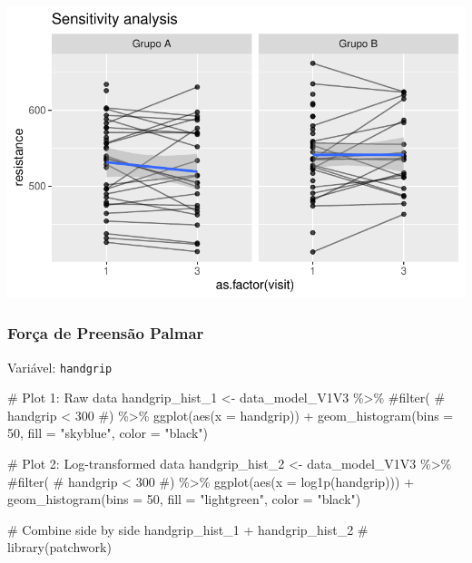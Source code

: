 \documentclass[
  letterpaper,
  DIV=11,
  numbers=noendperiod]{scrartcl}
\newenvironment{Shaded}{\begin{snugshade}}{\end{snugshade}}
\newcommand{\AttributeTok}[1]{\textcolor[rgb]{0.40,0.45,0.13}{#1}}
\newcommand{\CommentTok}[1]{\textcolor[rgb]{0.37,0.37,0.37}{#1}}
\newcommand{\DecValTok}[1]{\textcolor[rgb]{0.68,0.00,0.00}{#1}}
\newcommand{\FunctionTok}[1]{\textcolor[rgb]{0.28,0.35,0.67}{#1}}
\newcommand{\NormalTok}[1]{\textcolor[rgb]{0.00,0.23,0.31}{#1}}
\newcommand{\OtherTok}[1]{\textcolor[rgb]{0.00,0.23,0.31}{#1}}
\newcommand{\SpecialCharTok}[1]{\textcolor[rgb]{0.37,0.37,0.37}{#1}}
\newcommand{\StringTok}[1]{\textcolor[rgb]{0.13,0.47,0.30}{#1}}
\begin{document}
\includegraphics{Outcomes_V1V2V3_files/figure-pdf/resistance_6-2.pdf}

\subsubsection{Força de Preensão
Palmar}\label{foruxe7a-de-preensuxe3o-palmar}

Variável: \texttt{handgrip}

\begin{Shaded}
\begin{Highlighting}[]
\CommentTok{\# Plot 1: Raw data}
\NormalTok{handgrip\_hist\_1 }\OtherTok{\textless{}{-}}\NormalTok{ data\_model\_V1V3 }\SpecialCharTok{\%\textgreater{}\%} 
    \CommentTok{\#filter(}
    \CommentTok{\#    handgrip \textless{} 300}
    \CommentTok{\#) \%\textgreater{}\% }
    \FunctionTok{ggplot}\NormalTok{(}\FunctionTok{aes}\NormalTok{(}\AttributeTok{x =}\NormalTok{ handgrip)) }\SpecialCharTok{+} 
    \FunctionTok{geom\_histogram}\NormalTok{(}\AttributeTok{bins =} \DecValTok{50}\NormalTok{, }\AttributeTok{fill =} \StringTok{"skyblue"}\NormalTok{, }\AttributeTok{color =} \StringTok{"black"}\NormalTok{)}

\CommentTok{\# Plot 2: Log{-}transformed data}
\NormalTok{handgrip\_hist\_2 }\OtherTok{\textless{}{-}}\NormalTok{ data\_model\_V1V3 }\SpecialCharTok{\%\textgreater{}\%} 
    \CommentTok{\#filter(}
    \CommentTok{\#    handgrip \textless{} 300}
    \CommentTok{\#) \%\textgreater{}\%}
    \FunctionTok{ggplot}\NormalTok{(}\FunctionTok{aes}\NormalTok{(}\AttributeTok{x =} \FunctionTok{log1p}\NormalTok{(handgrip))) }\SpecialCharTok{+} 
    \FunctionTok{geom\_histogram}\NormalTok{(}\AttributeTok{bins =} \DecValTok{50}\NormalTok{, }\AttributeTok{fill =} \StringTok{"lightgreen"}\NormalTok{, }\AttributeTok{color =} \StringTok{"black"}\NormalTok{)}

\CommentTok{\# Combine side by side}
\NormalTok{handgrip\_hist\_1 }\SpecialCharTok{+}\NormalTok{ handgrip\_hist\_2 }\CommentTok{\# library(patchwork)}
\end{Highlighting}
\end{Shaded}
\end{document}
